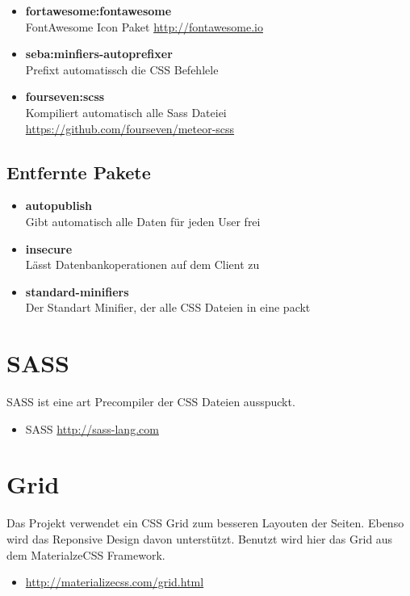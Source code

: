 \documentclass[Info_VK_Website_Dokumentation.tex]{subfiles}
\begin{document}
\begin{itemize}
 	\item \textbf{fortawesome:fontawesome}\\
 	FontAwesome Icon Paket
 	\small \url{http://fontawesome.io} 

 	\item \textbf{seba:minfiers-autoprefixer}\\
 	Prefixt automatissch die CSS Befehlele

 	\item \textbf{fourseven:scss}\\
 	Kompiliert automatisch alle Sass Dateiei \\
 	\small \url{https://github.com/fourseven/meteor-scss} 
 \end{itemize} 

\subsection{Entfernte Pakete}

\begin{itemize}
 	\item \textbf{autopublish}\\
 	Gibt automatisch alle Daten für jeden User frei
 	\item \textbf{insecure}\\
 	Lässt Datenbankoperationen auf dem Client zu
 	\item \textbf{standard-minifiers}\\
 	Der Standart Minifier, der alle CSS Dateien in eine packt
 \end{itemize} 



\section{SASS}

SASS ist eine art Precompiler der CSS Dateien ausspuckt.

\begin{itemize}
	\item SASS \url{http://sass-lang.com} 
\end{itemize}

\section{Grid}

Das Projekt verwendet ein CSS Grid zum besseren Layouten der Seiten. Ebenso wird das Reponsive Design davon unterstützt. Benutzt wird hier das Grid aus dem MaterialzeCSS Framework.

\begin{itemize}
 	\item \url{http://materializecss.com/grid.html} 
\end{itemize} 
\end{document}
